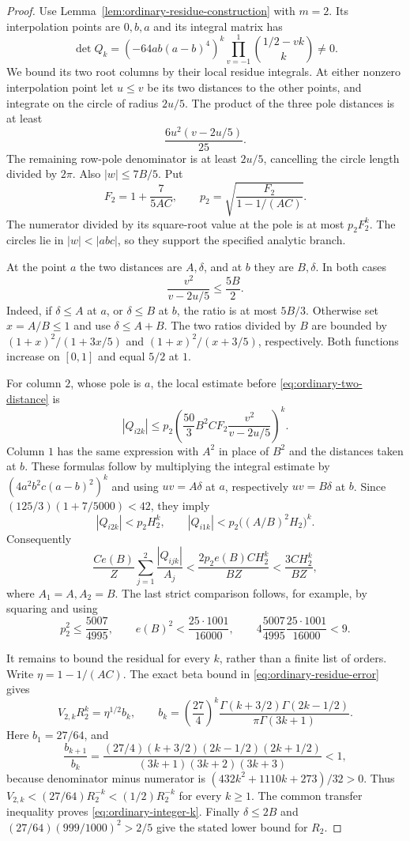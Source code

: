 \documentclass[12pt]{article}
\numberwithin{equation}{section}
\begin{document}
\begin{proof}
Use Lemma~\ref{lem:ordinary-residue-construction} with $m=2$.
Its interpolation points are $0,b,a$ and its integral matrix has
\[
 \det Q_k=(-64ab(a-b)^4)^k
           \prod_{v=-1}^{1}\binom{1/2-vk}{k}\ne0.
\]
We bound its two root columns by their local residue integrals.
At either nonzero interpolation point let $u\le v$ be its two
distances to the other points, and integrate on the circle of radius
$2u/5$.  The product of the three pole distances is at least
\[
 \frac{6u^2(v-2u/5)}{25}.
\]
The remaining row-pole denominator is at least $2u/5$, cancelling
the circle length divided by $2\pi$.  Also $|w|\le7B/5$.  Put
\[
 F_2=1+\frac7{5AC},\qquad
 p_2=\sqrt{\frac{F_2}{1-1/(AC)}}.
\]
The numerator divided by its square-root value at the pole is at
most $p_2F_2^k$.  The circles lie in $|w|<|abc|$, so they support
the specified analytic branch.

At the point $a$ the two distances are $A,\delta$, and at $b$ they
are $B,\delta$.  In both cases
\begin{equation}\label{eq:ordinary-two-distance}
 \frac{v^2}{v-2u/5}\le\frac{5B}{2}.
\end{equation}
Indeed, if $\delta\le A$ at $a$, or $\delta\le B$ at $b$, the
ratio is at most $5B/3$.  Otherwise set $x=A/B\le1$ and use
$\delta\le A+B$.  The two ratios divided by $B$ are bounded by
$(1+x)^2/(1+3x/5)$ and $(1+x)^2/(x+3/5)$, respectively.
Both functions increase on $[0,1]$ and equal $5/2$ at $1$.

For column $2$, whose pole is $a$, the local estimate before
\eqref{eq:ordinary-two-distance} is
\[
 |Q_{i2k}|\le p_2
 \left(\frac{50}{3}B^2CF_2
                  \frac{v^2}{v-2u/5}\right)^k.
\]
Column $1$ has the same expression with $A^2$ in place of $B^2$
and the distances taken at $b$.  These formulas follow by multiplying
the integral estimate by $(4a^2b^2c(a-b)^2)^k$ and using
$uv=A\delta$ at $a$, respectively $uv=B\delta$ at $b$.
Since $(125/3)(1+7/5000)<42$, they imply
\[
 |Q_{i2k}|<p_2H_2^k,\qquad
 |Q_{i1k}|<p_2\bigl((A/B)^2H_2\bigr)^k.
\]
Consequently
\[
 \frac{Ce(B)}Z\sum_{j=1}^2\frac{|Q_{ijk}|}{A_j}
 <\frac{2p_2e(B)CH_2^k}{BZ}
 <\frac{3CH_2^k}{BZ},
\]
where $A_1=A,A_2=B$.  The last strict comparison follows, for
example, by squaring and using
\[
 p_2^2\le\frac{5007}{4995},\qquad
 e(B)^2<\frac{25\cdot1001}{16000},\qquad
 4\frac{5007}{4995}\frac{25\cdot1001}{16000}<9.
\]

It remains to bound the residual for every $k$, rather than a finite
list of orders.  Write $\eta=1-1/(AC)$.  The exact beta bound in
\eqref{eq:ordinary-residue-error} gives
\[
 V_{2,k}R_2^k=\eta^{1/2}b_k,\qquad
 b_k=\left(\frac{27}{4}\right)^k
       \frac{\Gamma(k+3/2)\Gamma(2k-1/2)}
            {\pi\Gamma(3k+1)}.
\]
Here $b_1=27/64$, and
\[
 \frac{b_{k+1}}{b_k}=
 \frac{(27/4)(k+3/2)(2k-1/2)(2k+1/2)}
      {(3k+1)(3k+2)(3k+3)}<1,
\]
because denominator minus numerator is
$(432k^2+1110k+273)/32>0$.  Thus
$V_{2,k}<(27/64)R_2^{-k}<(1/2)R_2^{-k}$ for every $k\ge1$.
The common transfer inequality proves
\eqref{eq:ordinary-integer-k}.  Finally $\delta\le2B$ and
$(27/64)(999/1000)^2>2/5$ give the stated lower bound for $R_2$.


\end{proof}
\end{document}
